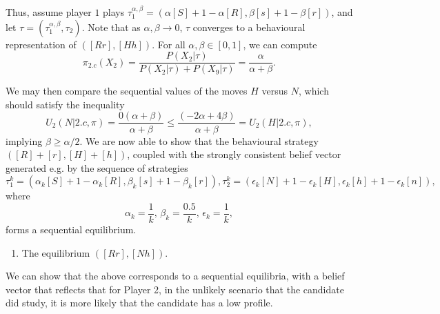 \begin{example}
Thus, assume player $1$ plays $\tau_1^{\alpha, \beta} = (\alpha[S] + 1-\alpha [R],\beta[s] + 1-\beta [r] )$, and let $\tau = (\tau_{1}^{\alpha, \beta}, \tau_2)$. Note that as $\alpha, \beta  \rightarrow 0$, $\tau$ converges to a behavioural representation of $([Rr], [Hh])$.
For all $\alpha, \beta \in [0,1]$, we can compute
$$\pi_{2.c}(X_2) = \frac{P(X_2 | \tau)}{ P(X_2 | \tau) + P(X_9 | \tau) }  = \frac{\alpha}{\alpha + \beta}.$$

We may then compare the sequential values of the moves $H$ versus $N$, which should satisfy the inequality
$$ U_2(N | 2.c, \pi) = \frac{0 (\alpha + \beta)}{\alpha + \beta} \leq \frac{( - 2\alpha + 4 \beta)}{\alpha + \beta} = U_2(H | 2.c , \pi),  $$
implying $\beta  \geq \alpha/2$.
We are now able to show that the behavioural strategy $([R] + [r], [H] + [h])$, coupled with the strongly consistent belief vector generated e.g. by the sequence of strategies
$$ \tau_1^k = (\alpha_k [S] + 1-\alpha_k [R], \beta_k [s] + 1-\beta_k [r]), \tau_2^k = (\epsilon_k [N] + 1 - \epsilon_k [H], \epsilon_k [h] +  1-\epsilon_k [n]), $$
where
$$\alpha_k =\frac{1}{k}, \, \beta_k = \frac{0.5}{k}, \, \epsilon_k = \frac{1}{k},$$
forms a sequential equilibrium.

\begin{enumerate}[resume]
\item The equilibrium $([Rr], [Nh])$.
\end{enumerate}

We can show that the above corresponds to a sequential equilibria, with a belief vector that reflects that for Player 2, in the unlikely scenario that the candidate did study, it is more likely that the candidate has a low profile.
\end{example}
\ifx \globalmark \undefined %


	
\else

\fi
